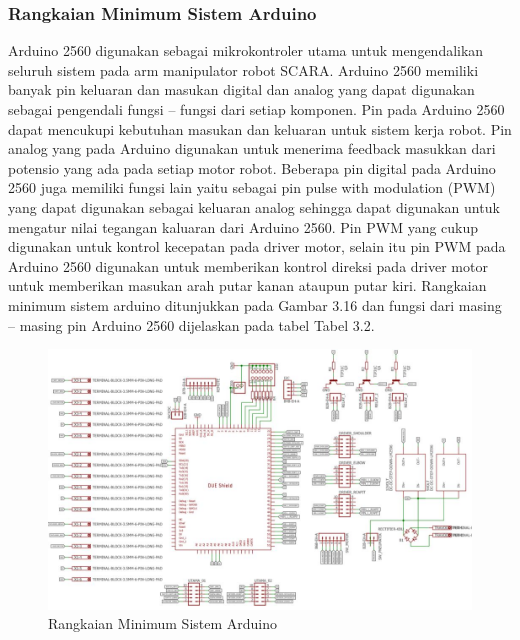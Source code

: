 \subsubsection{Rangkaian Minimum Sistem Arduino}
Arduino  2560 digunakan sebagai mikrokontroler utama untuk mengendalikan seluruh sistem pada arm manipulator robot SCARA. Arduino  2560 memiliki banyak pin keluaran dan masukan digital dan analog yang dapat digunakan sebagai pengendali fungsi – fungsi dari setiap komponen. Pin pada Arduino  2560 dapat mencukupi kebutuhan masukan dan keluaran untuk sistem kerja robot. Pin analog yang pada Arduino  digunakan untuk menerima feedback masukkan dari potensio yang ada pada setiap motor robot. Beberapa pin digital pada Arduino  2560 juga  memiliki fungsi lain yaitu sebagai pin pulse with modulation (PWM) yang dapat digunakan sebagai keluaran analog sehingga dapat digunakan untuk mengatur nilai tegangan kaluaran dari Arduino  2560. Pin PWM yang cukup digunakan untuk kontrol kecepatan pada driver motor, selain itu pin PWM pada Arduino  2560 digunakan untuk memberikan kontrol direksi pada driver motor untuk memberikan masukan arah putar kanan ataupun putar kiri. Rangkaian minimum sistem arduino ditunjukkan pada Gambar 3.16 dan fungsi dari masing – masing pin Arduino  2560 dijelaskan pada tabel Tabel 3.2. 
\begin{figure}[H]
	\centering
	\includegraphics[width=15cm]{gambar/skematik.pdf}
	\caption{Rangkaian Minimum Sistem Arduino}
\end{figure}
